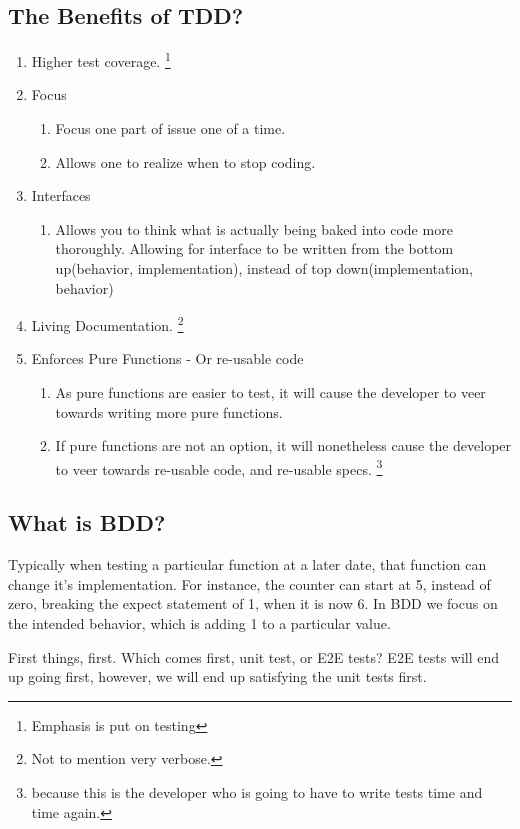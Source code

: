 \subsection{ The Benefits of TDD? }
\begin{enumerate}
  \item Higher test coverage. \footnote{Emphasis is put on testing}
  \item Focus
    \begin{enumerate}
      \item Focus one part of issue one of a time.
      \item Allows one to realize when to stop coding.
    \end{enumerate}
  \item Interfaces
    \begin{enumerate}
      \item Allows you to think what is actually being baked into code more
      thoroughly. Allowing for interface to be written from the bottom
      up(behavior, implementation), instead of top down(implementation,
      behavior)
    \end{enumerate}
  \item Living Documentation. \footnote{Not to mention very verbose.}
  \item Enforces Pure Functions - Or re-usable code
    \begin{enumerate}
      \item As pure functions are easier to test, it will cause the developer
      to veer towards writing more pure functions.
      \item If pure functions are not an option, it will nonetheless cause the
      developer to veer towards re-usable code, and re-usable specs. \footnote{
      because this is the developer who is going to have to write tests time
      and time again.
      }
    \end{enumerate}
\end{enumerate}

\subsection{ What is BDD? }
Typically when testing a particular function at a later date, that function can
change it's implementation. For instance, the counter can start at 5, instead of
zero, breaking the expect statement of 1, when it is now 6. In BDD we focus on
the intended behavior, which is adding 1 to a particular value. 

First things, first. Which comes first, unit test, or E2E tests? E2E tests will
end up going first, however, we will end up satisfying the unit tests first.
